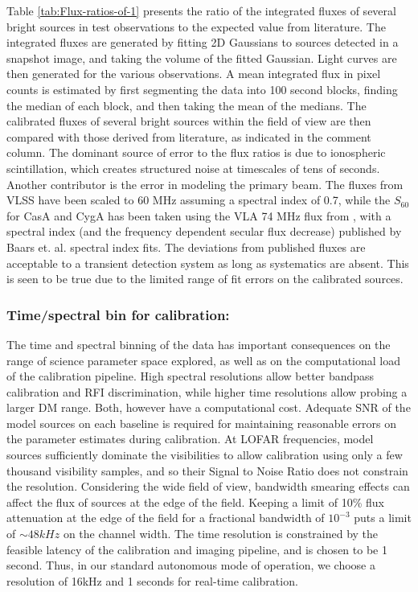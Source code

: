 \documentclass{aa}
\begin{document}
Table \ref{tab:Flux-ratios-of-1} presents the  ratio of the integrated fluxes of
several  bright  sources  in  test  observations  to  the  expected  value  from
literature.   The integrated  fluxes are  generated by  fitting 2D  Gaussians to
sources  detected in  a snapshot  image,  and taking  the volume  of the  fitted
Gaussian. Light curves  are then generated for the  various observations. A mean
integrated flux in  pixel counts is estimated by first  segmenting the data into
100 second blocks, finding the median of each block, and then taking the mean of
the medians.  The  calibrated fluxes of several bright  sources within the field
of view  are then compared with  those derived from literature,  as indicated in
the comment column.  The  dominant source of error to the flux  ratios is due to
ionospheric scintillation,  which creates structured noise at  timescales of tens
of seconds. Another  contributor is the error in modeling  the primary beam. The
fluxes from VLSS  have been scaled to  60 MHz assuming a spectral  index of 0.7,
while the $S_{60}$  for CasA and CygA has  been taken using the VLA  74 MHz flux
from \citet{kassim200774},  with a spectral  index (and the  frequency dependent
secular  flux decrease)  published by  Baars et.  al.  \citep{baars1977absolute}
spectral index  fits. The deviations from  published fluxes are  acceptable to a
transient detection system as long as systematics are absent. This is seen to be
true due to the limited range of fit errors on the calibrated sources.

\subsubsection{Time/spectral bin for calibration:} 
The time  and spectral  binning of  the data has  important consequences  on the
range of science parameter space explored,  as well as on the computational load
of the  calibration pipeline.  High  spectral resolutions allow  better bandpass
calibration and RFI discrimination,  while higher time resolutions allow probing
a larger DM range.  Both, however have a computational cost. Adequate SNR of the
model sources on each baseline  is required for maintaining reasonable errors on
the parameter estimates during calibration.  At LOFAR frequencies, model sources
sufficiently dominate  the visibilities  to allow calibration  using only  a few
thousand  visibility  samples, and  so  their Signal  to  Noise  Ratio does  not
constrain  the  resolution.   Considering  the  wide field  of  view,  bandwidth
smearing  effects  can   affect  the  flux  of  sources  at   the  edge  of  the
field. Keeping a limit  of 10\% flux attenuation at the edge  of the field for a
fractional bandwidth  of $10^{-3}$ puts a  limit of $\sim48 kHz$  on the channel
width.   The time  resolution  is constrained  by  the feasible  latency of  the
calibration and  imaging pipeline, and is chosen  to be 1 second.   Thus, in our
standard autonomous  mode of operation,  we choose a  resolution of 16kHz  and 1
seconds for real-time calibration.
\end{document}
